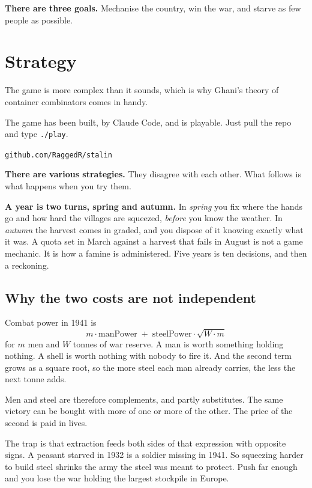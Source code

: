 \documentclass[11pt,a4paper]{article}
\begin{document}
\textbf{There are three goals.} Mechanise the country, win the war, and starve as few people as
possible.


\newpage

\section{Strategy}
\label{sec:strategy}

The game is more complex than it sounds, which is why Ghani's theory of container combinators comes
in handy.

The game has been built, by Claude Code, and is playable. Just pull the repo and type
\texttt{./play}.

\begin{center}
\texttt{github.com/RaggedR/stalin}
\end{center}

\textbf{There are various strategies.} They disagree with each other. What follows is what happens when you try them.

\textbf{A year is two turns, spring and autumn.} In \emph{spring} you fix where the hands go and
how hard the villages are squeezed, \emph{before} you know the weather. In \emph{autumn} the
harvest comes in graded, and you dispose of it knowing exactly what it was. A quota set in March
against a harvest that fails in August is not a game mechanic. It is how a famine is administered.
Five years is ten decisions, and then a reckoning.

\subsection{Why the two costs are not independent}

Combat power in 1941 is
\[
  m \cdot \mathrm{manPower} \;+\; \mathrm{steelPower} \cdot \sqrt{W \cdot m}
\]
for $m$ men and $W$ tonnes of war reserve. A man is worth something holding nothing. A shell is
worth nothing with nobody to fire it. And the second term grows as a square root, so the more steel
each man already carries, the less the next tonne adds.

Men and steel are therefore complements, and partly substitutes. The same victory can be bought
with more of one or more of the other. The price of the second is paid in lives.

The trap is that extraction feeds both sides of that expression with opposite signs. A peasant
starved in 1932 is a soldier missing in 1941. So squeezing harder to build steel shrinks the army
the steel was meant to protect. Push far enough and you lose the war holding the largest stockpile
in Europe.
\end{document}
